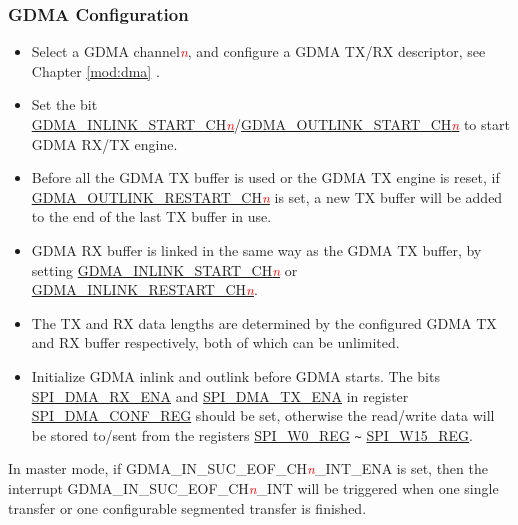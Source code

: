 \documentclass[main\_\_EN.tex]{subfiles}
\begin{document}
\subsubsection{GDMA Configuration}\label{sec:DMA-conf}


\begin{itemize}
    \item Select a GDMA channel\textcolor{red}{\it{n}}, and configure a GDMA TX/RX descriptor, see Chapter \ref{mod:dma} \textit{}.

    \item Set the bit \hyperref[fielddesc:DMAINLINKSTARTCHN]{GDMA\_INLINK\_START\_CH\textcolor{red}{\it{n}}}/\hyperref[fielddesc:DMAOUTLINKSTARTCHN]{GDMA\_OUTLINK\_START\_CH\textcolor{red}{\it{n}}} to start GDMA RX/TX engine.

    \item Before all the GDMA TX buffer is used or the GDMA TX engine is reset, if  \hyperref[fielddesc:DMAOUTLINKRESTARTCHN]{GDMA\_OUTLINK\_RESTART\_CH\textcolor{red}{\it{n}}} is set, a new TX buffer will be added to the end of the last TX buffer in use.

    \item GDMA RX buffer is linked in the same way as the GDMA TX buffer, by setting \hyperref[fielddesc:DMAINLINKSTARTCHN]{GDMA\_INLINK\_START\_CH\textcolor{red}{\it{n}}} or \hyperref[fielddesc:DMAINLINKRESTARTCHN]{GDMA\_INLINK\_RESTART\_CH\textcolor{red}{\it{n}}}.

    \item The TX and RX data lengths are determined by the configured GDMA TX and RX buffer respectively, both of which can be unlimited.

    \item Initialize GDMA inlink and outlink before GDMA starts. The bits \hyperref[fielddesc:SPIDMARXENA]{SPI\_DMA\_RX\_ENA} and \hyperref[fielddesc:SPIDMATXENA]{SPI\_DMA\_TX\_ENA} in register \hyperref[regdesc:SPIDMACONFREG]{SPI\_DMA\_CONF\_REG} should be set, otherwise the read/write data will be stored to/sent from the registers \hyperref[regdesc:SPIW0REG]{SPI\_W0\_REG} \verb+~+ \hyperref[regdesc:SPIW15REG]{SPI\_W15\_REG}.

\end{itemize}

In master mode, if GDMA\_IN\_SUC\_EOF\_CH\textcolor{red}{\it{n}}\_INT\_ENA is set, then the interrupt GDMA\_IN\_SUC\_EOF\_CH\textcolor{red}{\it{n}}\_INT will be triggered when one single transfer or one configurable segmented transfer is finished.
\end{document}
